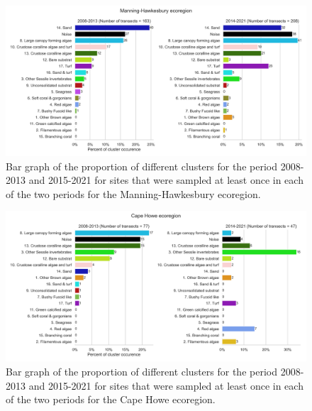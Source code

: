 \begin{figure}
\hypertarget{fig:chap2figS42}{%
\centering
\includegraphics{03-Chapitre2/figures/supplementary/08-temporal_change_ecoregion_Manning-Hawkesbury.png}
\caption{Bar graph of the proportion of different clusters for the
period 2008-2013 and 2015-2021 for sites that were sampled at least once
in each of the two periods for the Manning-Hawkesbury
ecoregion.}\label{fig:chap2figS42}
}
\end{figure}

\begin{figure}
\hypertarget{fig:chap2figS40}{%
\centering
\includegraphics{03-Chapitre2/figures/supplementary/08-temporal_change_ecoregion_CapeHowe.png}
\caption{Bar graph of the proportion of different clusters for the
period 2008-2013 and 2015-2021 for sites that were sampled at least once
in each of the two periods for the Cape Howe
ecoregion.}\label{fig:chap2figS40}
}
\end{figure}

